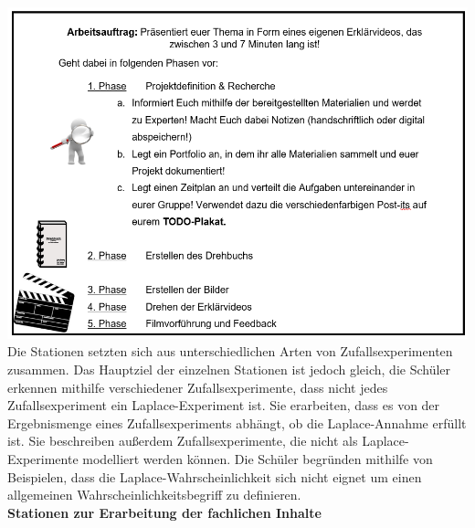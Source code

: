 \documentclass[a4paper,12pt,twoside=false]{scrartcl}
\begin{document}
\includegraphics[scale = 0.6]{Projektauftrag.png}\\
Die Stationen setzten sich aus unterschiedlichen Arten von Zufallsexperimenten zusammen. Das Hauptziel der einzelnen Stationen ist jedoch gleich, die Schüler erkennen mithilfe verschiedener Zufallsexperimente, dass nicht jedes Zufallsexperiment ein Laplace-Experiment ist. Sie erarbeiten, dass es von der Ergebnismenge eines Zufallsexperiments abhängt, ob die Laplace-Annahme erfüllt ist. Sie beschreiben außerdem Zufallsexperimente, die nicht als Laplace-Experimente modelliert werden können. Die Schüler begründen mithilfe von Beispielen, dass die Laplace-Wahrscheinlichkeit sich nicht eignet um einen allgemeinen Wahrscheinlichkeitsbegriff zu definieren. \\
\large{\textbf{Stationen zur Erarbeitung der fachlichen Inhalte}}\\
\end{document}
